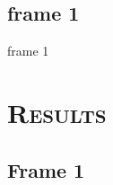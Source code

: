 \documentclass[xcolor=x11names,compress]{beamer}
\renewcommand{\(}{\begin{columns}}
\renewcommand{\)}{\end{columns}}
\newcommand{\<}[1]{\begin{column}{#1}}
\renewcommand{\>}{\end{column}}
\begin{document}
\subsection{frame 1}
\begin{frame}{frame 1}

\end{frame}

\section{\scshape Results}
\subsection{Frame 1}
\end{document}
